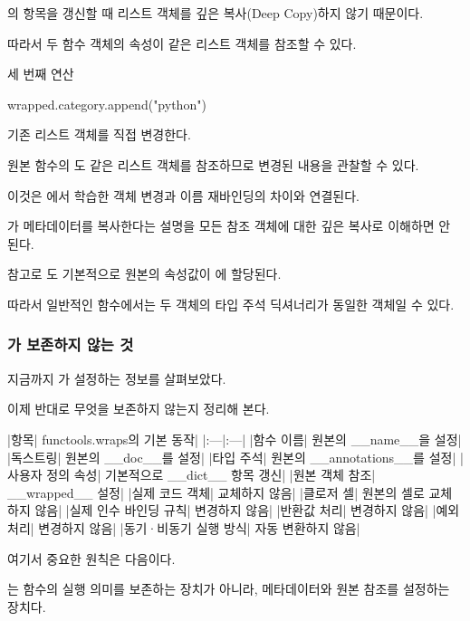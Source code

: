 의 항목을 갱신할 때 리스트 객체를 깊은 복사(Deep Copy)하지 않기 때문이다.

따라서 두 함수 객체의  속성이 같은 리스트 객체를 참조할 수 있다.

\begin{dhknote}
\begin{dhksmry}[centered]
세 번째 연산
\end{dhksmry}
\end{dhknote}

\begin{dhkcode}
wrapped.category.append("python")
\end{dhkcode}

기존 리스트 객체를 직접 변경한다.

원본 함수의 도 같은 리스트 객체를 참조하므로 변경된 내용을 관찰할 수 있다.

이것은 에서 학습한 객체 변경과 이름 재바인딩의 차이와 연결된다.

가 메타데이터를 복사한다는 설명을 모든 참조 객체에 대한 깊은 복사로 이해하면 안 된다.

참고로 도 기본적으로 원본의 속성값이 에 할당된다.

따라서 일반적인 함수에서는 두 객체의 타입 주석 딕셔너리가 동일한 객체일 수 있다.

\subsubsection{가 보존하지 않는 것}

지금까지 가 설정하는 정보를 살펴보았다.

이제 반대로 무엇을 보존하지 않는지 정리해 본다.

\begin{dhktable}
|항목|	functools.wraps의 기본 동작|
|:---|:---|
|함수 이름|	원본의 __name__을 설정|
|독스트링|	원본의 __doc__를 설정|
|타입 주석|	원본의 __annotations__를 설정|
|사용자 정의 속성|	기본적으로 __dict__ 항목 갱신|
|원본 객체 참조|	__wrapped__ 설정|
|실제 코드 객체|	교체하지 않음|
|클로저 셀|	원본의 셀로 교체하지 않음|
|실제 인수 바인딩 규칙|	변경하지 않음|
|반환값 처리|	변경하지 않음|
|예외 처리|	변경하지 않음|
|동기·비동기 실행 방식|	자동 변환하지 않음|
\end{dhktable}

여기서 중요한 원칙은 다음이다.

는 함수의 실행 의미를 보존하는 장치가 아니라, 메타데이터와 원본 참조를 설정하는 장치다.

